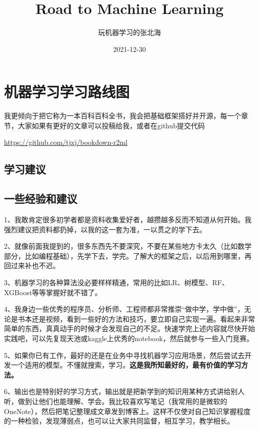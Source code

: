 \documentclass[
]{book}
\title{Road to Machine Learning}
\author{玩机器学习的张北海}
\date{2021-12-30}
\begin{document}
\maketitle

{
\setcounter{tocdepth}{1}
\tableofcontents
}
\hypertarget{ux673aux5668ux5b66ux4e60ux5b66ux4e60ux8defux7ebfux56fe}{%
\chapter{机器学习学习路线图}\label{ux673aux5668ux5b66ux4e60ux5b66ux4e60ux8defux7ebfux56fe}}

我更倾向于把它称为一本百科百科全书，我会把基础框架搭好并开源，每一个章节，大家如果有更好的文章可以投稿给我，或者在github提交代码

\url{https://github.com/tjxj/bookdown-r2ml}

\hypertarget{ux5b66ux4e60ux5efaux8bae}{%
\section{学习建议}\label{ux5b66ux4e60ux5efaux8bae}}

\hypertarget{ux4e00ux4e9bux7ecfux9a8cux548cux5efaux8bae}{%
\section{一些经验和建议}\label{ux4e00ux4e9bux7ecfux9a8cux548cux5efaux8bae}}

1、我敢肯定很多初学者都是资料收集爱好者，越攒越多反而不知道从何开始。我强烈建议把资料都扔掉，以我的这一套为准，一以贯之的学下去。

2、就像前面我提到的，很多东西先不要深究，不要在某些地方卡太久（比如数学部分，比如编程基础），先学下去，学完。了解大的框架之后，以后用到哪里，再回过来补也不迟。

3、机器学习的各种算法没必要样样精通，常用的比如LR、树模型、RF、XGBoost等等掌握好就不错了。

4、我身边一些优秀的程序员、分析师、工程师都非常推崇``做中学，学中做''，无论是书本还是视频，看到一些好的方法和技巧，要立即自己实现一遍。看起来非常简单的东西，真真动手的时候才会发现自己的不足。快速学完上述内容就尽快开始实践吧，可以先复现天池或kaggle上优秀的notebook，然后就参与一些入门竞赛。

5、如果你已有工作，最好的还是在业务中寻找机器学习应用场景，然后尝试去开发一个适用的模型。不懂就搜索，学习。\textbf{这是我所知最好的，最有价值的学习方法。}

6、输出也是特别好的学习方式，输出就是把新学到的知识用某种方式讲给别人听，做到让他们也能理解、学会。我比较喜欢写笔记（我常用的是微软的OneNote），然后把笔记整理成文章发到博客上。这样不仅使对自己知识掌握程度的一种检验，发现薄弱点，也可以让大家共同监督，相互学习，教学相长。
\end{document}
